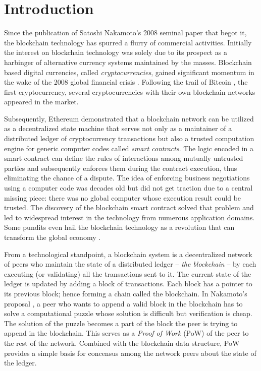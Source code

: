 \section{Introduction}
Since the publication of Satoshi Nakamoto's 2008 seminal paper \cite{bitcoin} that begot it, the blockchain technology has spurred a flurry of commercial activities. Initially the interest on blockchain technology was solely due to its prospect as a harbinger of alternative currency systems maintained by the masses. Blockchain based digital currencies, called \textit{cryptocurrencies}, gained significant momentum in the wake of the 2008 global financial crisis \cite{fincrisis}. Following the trail of Bitcoin \cite{bitcoin}, the first cryptocurrency, several cryptocurrencies \cite{bitcoinCash} \cite{David:2018:DCW:3208446} \cite{Takashima:2018:LUG:3235215} \cite{dogecoin} \cite{neo} with their own blockchain networks appeared in the market.
 
Subsequently, Ethereum \cite{Wood2014EthereumAS} demonstrated that a blockchain network can be utilized as a decentralized state machine that serves not only as a maintainer of a distributed ledger of cryptocurrency transactions but also a trusted computation engine for generic computer codes called \textit{smart contracts}. The logic encoded in a smart contract can define the rules of interactions among mutually untrusted parties and subsequently enforces them during the contract execution, thus eliminating the chance of a dispute. The idea of enforcing business negotiations using a computer code was decades old \cite{FM548} but did not get traction due to a central missing piece: there was no global computer whose execution result could be trusted. The discovery of the blockchain smart contract solved that problem and led to widespread interest in the technology from numerous application domains. Some pundits even hail the blockchain technology as a revolution that can transform the global economy \cite{blockchainRevolution1} \cite{blockchainRevolution2}.

From a technological standpoint, a blockchain system is a decentralized network of peers who maintain the state of a distributed ledger -- \textit{the blockchain} -- by each executing (or validating) all the transactions sent to it. The current state of the ledger is updated by adding a block of transactions. Each block has a pointer to its previous block; hence forming a chain called the blockchain. In Nakamoto's proposal \cite{bitcoin}, a peer who wants to append a valid block in the blockchain has to solve a computational puzzle whose solution is difficult but verification is cheap. The solution of the puzzle becomes a part of the block the peer is trying to append in the blockchain. This serves as a \textit{Proof of Work} (PoW) \cite{Back02hashcash} of the peer to the rest of the network. Combined with the blockchain data structure, PoW provides a simple basis for concensus \cite{Barborak:1993:CPF:152610.152612} among the network peers about the state of the ledger.

